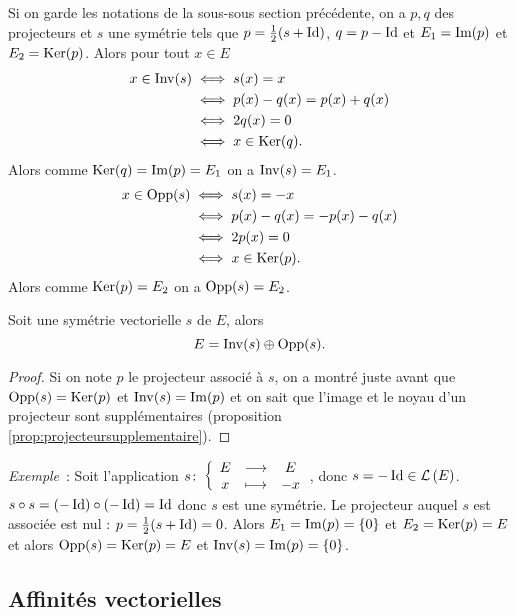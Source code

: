Si on garde les notations de la sous-sous section précédente, on a \(p,q\) des projecteurs et \(s\) une symétrie tels que \(p=\frac{1}{2}(s+\operatorname{Id})\), \(q=p-\operatorname{Id}\) et \(E_1=\operatorname{Im}(p)\) et \(E_2=\operatorname{Ker}(p)\). Alors pour tout \(x \in E\)
\begin{align}
  x \in \operatorname{Inv}(s) &\iff s(x)=x \\
  &\iff p(x)-q(x)=p(x)+q(x) \\
  &\iff 2q(x)=0\\
  &\iff x \in \operatorname{Ker}(q).
\end{align}
Alors comme \(\operatorname{Ker}(q)=\operatorname{Im}(p)=E_1\) on a \(\operatorname{Inv}(s)=E_1\).
\begin{align}
   x \in \operatorname{Opp}(s) &\iff s(x)=-x \\
  &\iff p(x)-q(x)=-p(x)-q(x) \\
  &\iff 2p(x)=0\\
  &\iff x \in \operatorname{Ker}(p).
\end{align}
Alors comme \(\operatorname{Ker}(p)=E_2\) on a \(\operatorname{Opp}(s)=E_2\).
%
\begin{prop}
  Soit une symétrie vectorielle \(s\) de \(E\), alors
\begin{equation}
  E=\operatorname{Inv}(s) \oplus \operatorname{Opp}(s).
\end{equation}
\end{prop}
\begin{proof}
  Si on note \(p\) le projecteur associé à \(s\), on a montré juste avant que \(\operatorname{Opp}(s)=\operatorname{Ker}(p)\) et \(\operatorname{Inv}(s)=\operatorname{Im}(p)\) et on sait que l'image et le noyau d'un projecteur sont supplémentaires (proposition~
\ref{prop:projecteursupplementaire}).
\end{proof}

\emph{Exemple}~: Soit l'application \(s\colon \left\{\begin{array}{ccc} E & \longrightarrow &E\\ x & \longmapsto & -x \end{array} \right.\), donc \(s=-\operatorname{Id} \in \mathcal{L}\left(E\right)\). \(s \circ s = (-\operatorname{Id}) \circ (-\operatorname{Id}) = \operatorname{Id}\) donc \(s\) est une symétrie. Le projecteur auquel \(s\) est associée est nul : \(p=\frac{1}{2}(s+\operatorname{Id})=0\). Alors \(E_1=\operatorname{Im}(p)=\{0\}\) et \(E_2=\operatorname{Ker}(p)=E\) et alors \(\operatorname{Opp}(s)=\operatorname{Ker}(p)=E\) et \(\operatorname{Inv}(s)=\operatorname{Im}(p)=\{0\}\).

\subsection{Affinités vectorielles}
